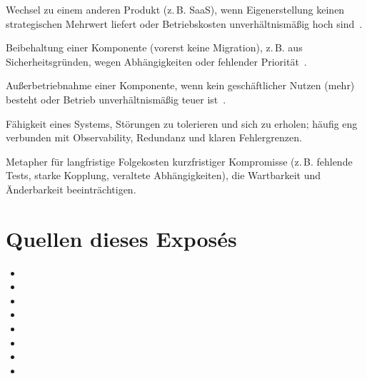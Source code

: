 \begin{description}[style=nextline]
  \item[Repurchase/Replace:] Wechsel zu einem anderen Produkt (z.\,B. SaaS), wenn Eigenerstellung keinen strategischen Mehrwert liefert oder Betriebskosten unverhältnismäßig hoch sind~\cite{aws2023sixRs}.

  \item[Retain:] Beibehaltung einer Komponente (vorerst keine Migration), z.\,B. aus Sicherheitsgründen, wegen Abhängigkeiten oder fehlender Priorität~\cite{aws2023sixRs}.

  \item[Retire:] Außerbetriebnahme einer Komponente, wenn kein geschäftlicher Nutzen (mehr) besteht oder Betrieb unverhältnismäßig teuer ist~\cite{aws2023sixRs}.

  \item[Resilienz:] Fähigkeit eines Systems, Störungen zu tolerieren und sich zu erholen; häufig eng verbunden mit Observability, Redundanz und klaren Fehlergrenzen.

  \item[Technische Schulden:] Metapher für langfristige Folgekosten kurzfristiger Kompromisse (z.\,B. fehlende Tests, starke Kopplung, veraltete Abhängigkeiten), die Wartbarkeit und Änderbarkeit beeinträchtigen.

\end{description}
\endgroup

\section*{Quellen dieses Exposés}

\begingroup
\RaggedRight
\begin{itemize}
  \item {}
  \item {}
  \item {}
  \item {}
  \item {}
  \item {}
  \item {}
  \item {}
\end{itemize}
\endgroup

